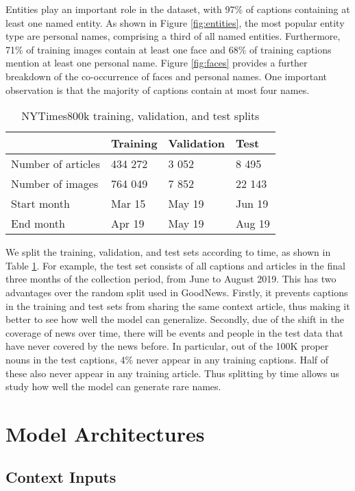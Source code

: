 \documentclass[10pt,twocolumn,letterpaper]{article}
\begin{document}
Entities play an important role in the dataset, with 97\% of captions
containing at least one named entity. As shown in Figure \ref{fig:entities},
the most popular entity type are personal names, comprising a third of all
named entities. Furthermore, 71\% of training images contain at least one face
and 68\% of training captions mention at least one personal name. Figure
\ref{fig:faces} provides a further breakdown of the co-occurrence of faces and
personal names. One important observation is that the majority of captions
contain at most four names.


\begin{table}[t]
	\caption {NYTimes800k training, validation, and test splits}
	\label{tab:splits}
	\centering
	\begin{tabular}{llll}
		\toprule
		  & Training  &   Validation & Test \\
		\midrule
      Number of articles & 434 272 & 3 052 & 8 495 \\
      Number of images  & 764 049 & 7 852 & 22 143 \\
      Start month & Mar 15 & May 19 & Jun 19 \\
      End month & Apr 19 & May 19 & Aug 19 \\
		\bottomrule
	\end{tabular}
\end{table}

We split the training, validation, and test sets according to time, as shown in
Table \ref{tab:splits}. For example, the test set consists of all captions and
articles in the final three months of the collection period, from June to
August 2019. This has two advantages over the random split used in GoodNews.
Firstly, it prevents captions in the training and test sets from sharing the
same context article, thus making it better to see how well the model can
generalize. Secondly, due of the shift in the coverage of news over time, there
will be events and people in the test data that have never covered by the news
before. In particular, out of the 100K proper nouns in the test captions, 4\%
never appear in any training captions. Half of these also never appear in any
training article. Thus splitting by time allows us study how well the model can
generate rare names.


\section{Model Architectures}

\subsection{Context Inputs}
\end{document}
